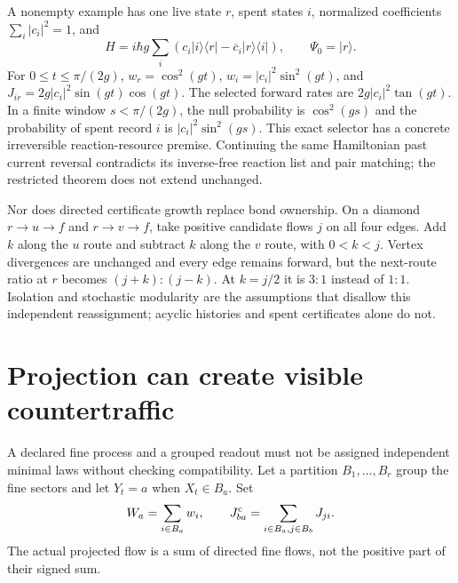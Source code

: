 \documentclass[11pt,oneside,openany]{book}
\theoremstyle{definition}
\theoremstyle{remark}\newtheorem{remark}[theorem]{Remark}
\begin{document}
A nonempty example has one live state $r$, spent states $i$, normalized
coefficients $\sum_i|c_i|^2=1$, and
\[
 H=i\hbar g\sum_i(c_i|i\rangle\langle r|
                  -\overline c_i|r\rangle\langle i|),
 \qquad \Psi_0=|r\rangle.
\]
For $0\leq t\leq\pi/(2g)$,
$w_r=\cos^2(gt)$, $w_i=|c_i|^2\sin^2(gt)$, and
$J_{ir}=2g|c_i|^2\sin(gt)\cos(gt)$. The selected forward rates are
$2g|c_i|^2\tan(gt)$. In a finite window $s<\pi/(2g)$, the null probability
is $\cos^2(gs)$ and the probability of spent record $i$ is
$|c_i|^2\sin^2(gs)$. This exact selector has a concrete irreversible
reaction-resource premise. Continuing the same Hamiltonian past current
reversal contradicts its inverse-free reaction list and pair matching;
the restricted theorem does not extend unchanged.

Nor does directed certificate growth replace bond ownership. On a diamond
$r\to u\to f$ and $r\to v\to f$, take positive candidate flows $j$ on all
four edges. Add $k$ along the $u$ route and subtract $k$ along the $v$ route,
with $0<k<j$. Vertex divergences are unchanged and every edge remains
forward, but the next-route ratio at $r$ becomes $(j+k):(j-k)$. At $k=j/2$
it is $3:1$ instead of $1:1$. Isolation and stochastic modularity are the
assumptions that disallow this independent reassignment; acyclic histories
and spent certificates alone do not.

\section{Projection can create visible countertraffic}

A declared fine process and a grouped readout must not be assigned
independent minimal laws without checking compatibility. Let a partition
$B_1,\ldots,B_r$ group the fine sectors and let $Y_t=a$ when $X_t\in B_a$.
Set
\begin{equation}\label{stat:coarse-data}
 W_a=\sum_{i\in B_a}w_i,\qquad
 J^{\rm c}_{ba}=\sum_{i\in B_a,j\in B_b}J_{ji}.
\end{equation}
The actual projected flow is a sum of directed fine flows, not the positive
part of their signed sum.
\end{document}
